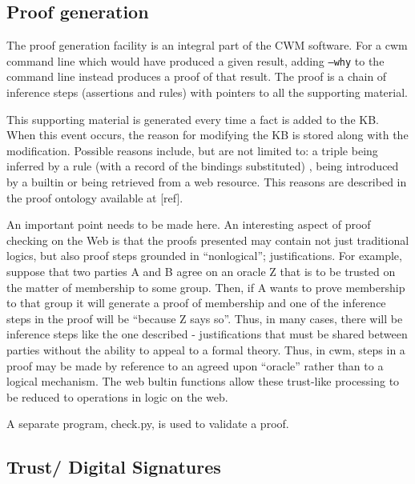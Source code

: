 \documentclass{tlp}
\begin{document}
\subsection{Proof generation}
  

\par The proof generation facility is an integral part of the CWM
software. For a cwm command line which would have produced a given
result, adding {\tt --why} to the command line instead
produces a proof of that result. The proof is a chain of inference
steps (assertions and rules) with pointers to all the supporting
material.

\par This supporting material is generated every time a fact is added
to the KB. When this event occurs, the reason for modifying the KB
is stored along with the modification. Possible reasons include,
but are not limited to: a triple being inferred by a rule (with a
record of the bindings substituted) , being introduced by a builtin
or being retrieved from a web resource. This reasons are described
in the proof ontology available at [ref].

\par An important point needs to be made here. An interesting aspect
of proof checking on the Web is that the proofs presented may
contain not just traditional logics, but also proof steps grounded
in ``nonlogical''; justifications. For example, suppose
that two parties A and B agree on an oracle Z that is to be trusted
on the matter of membership to some group. Then, if A wants to
prove membership to that group it will generate a proof of
membership and one of the inference steps in the proof will be
``because Z says so''. Thus, in many cases, there will be
inference steps like the one described - justifications that must
be shared between parties without the ability to appeal to a formal
theory. Thus, in cwm, steps in a proof may be made by reference to
an agreed upon ``oracle'' rather than to a logical
mechanism. The web bultin functions allow these trust-like
processing to be reduced to operations in logic on the web.

\par A separate program, check.py, is used to validate a proof.
\subsection{Trust/ Digital Signatures}
  
\end{document}
